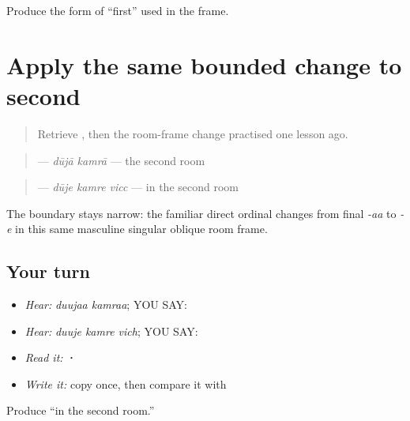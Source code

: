 \begin{tcolorbox}[breakable,colback=teal!4,colframe=teal!35!black,title={Before you move on}]
Produce the form of “first” used in the \textbf{ } frame.
\end{tcolorbox}
\section[\texorpdfstring{\pa{ਦੂਜੇ} (duuje)}{ਦੂਜੇ (duuje)}]{Apply the same bounded change to second}

\label{lesson:PA-C193-duje}



\begin{quote}
Retrieve \textbf{}, then the room-frame change practised one lesson ago.
\end{quote}

\begin{grammarlens}[title={Grammar Lens: direct owner}]
\begin{quote}
\textbf{ } — \emph{dūjā kamrā} — the second room
\end{quote}

\begin{quote}
\textbf{  } — \emph{dūje kamre vicc} — in the second room
\end{quote}

The boundary stays narrow: the familiar direct ordinal changes from final \emph{-aa} to \emph{-e} in this same masculine singular oblique room frame.
\end{grammarlens}

\subsection*{Your turn}
\begin{itemize}
\raggedright
  \item \emph{Hear:} \emph{duujaa kamraa}; YOU SAY: \textbf{ }
  \item \emph{Hear:} \emph{duuje kamre vich}; YOU SAY: \textbf{  }
  \item \emph{Read it:} \textbf{  ·   }
  \item \emph{Write it:} copy \textbf{} once, then compare it with \textbf{}
\end{itemize}

\begin{tcolorbox}[breakable,colback=teal!4,colframe=teal!35!black,title={Before you move on}]
Produce “in the second room.”
\end{tcolorbox}
